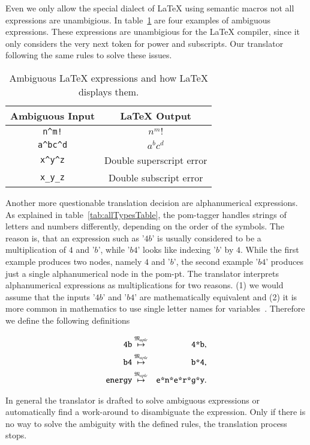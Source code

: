 Even we only allow the special dialect of \LaTeX{} using semantic macros not all expressions are unambigious. In table~\ref{tab:amb-latex} are four examples of ambiguous expressions. These expressions are unambigious for the \LaTeX{} compiler, since it only considers the very next token for power and subscripts. Our translator following the same rules to solve these issues.

\begin{table}[ht]
\centering
\begin{tabular}{cc}
	\hline
	Ambiguous Input & \LaTeX{} Output\\
	\hline
	\verb|n^m!| & $n^m!$\\
	\verb|a^bc^d| & $a^bc^d$\\
	\verb|x^y^z| & Double superscript error\\
	\verb|x_y_z| & Double subscript error\\
	\hline
\end{tabular}
\caption{Ambiguous \LaTeX{} expressions and how \LaTeX{} displays them.}
\label{tab:amb-latex}
\end{table}

Another more questionable translation decision are alphanumerical expressions. As explained in table~\ref{tab:allTypesTable}, the \gls*{pom}-tagger handles strings of letters and numbers differently, depending on the order of the symbols. The reason is, that an expression such as '$4b$' is usually considered to be a multiplication of $4$ and '$b$', while '$b4$' looks like indexing '$b$' by $4$. While the first example produces two nodes, namely $4$ and '$b$', the second example '$b4$' produces just a single alphanumerical node in the \gls*{pom-pt}. The translator interprets alphanumerical expressions as multiplications for two reasons. (1) we would assume that the inputs '$4b$' and '$b4$' are mathematically equivalent and (2) it is more common in mathematics to use single letter names for variables~\parencite{Notation:History}. Therefore we define the following definitions

\begin{eqnarray*}
\verb|4b| & \overset{\langMaple}{\mapsto} & \verb|4*b|,\\
\verb|b4| & \overset{\langMaple}{\mapsto} & \verb|b*4|,\\
\verb|energy| & \overset{\langMaple}{\mapsto} & \verb|e*n*e*r*g*y|.
\end{eqnarray*}

In general the translator is drafted to solve ambiguous expressions or automatically find a work-around to disambiguate the expression. Only if there is no way to solve the ambiguity with the defined rules, the translation process stops.

